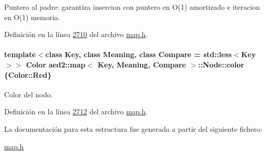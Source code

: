 Puntero al padre\-: garantiza insercion con puntero en O(1) amortizado e iteracion en O(1) memoria. 



Definición en la línea \hyperlink{map_8h_source_l02710}{2710} del archivo \hyperlink{map_8h_source}{map.\-h}.

\hypertarget{structaed2_1_1map_1_1Node_a58dd9993fee8ee3eaa5716b72a3eca47_a58dd9993fee8ee3eaa5716b72a3eca47}{
\paragraph[{color}]{\setlength{\rightskip}{0pt plus 5cm}template$<$class Key, class Meaning, class Compare = std\-::less$<$\-Key$>$$>$ {\bf Color} {\bf aed2\-::map}$<$ Key, Meaning, Compare $>$\-::Node\-::color \{Color\-::\-Red\}}}\label{structaed2_1_1map_1_1Node_a58dd9993fee8ee3eaa5716b72a3eca47_a58dd9993fee8ee3eaa5716b72a3eca47}


Color del nodo. 



Definición en la línea \hyperlink{map_8h_source_l02712}{2712} del archivo \hyperlink{map_8h_source}{map.\-h}.



La documentación para esta estructura fue generada a partir del siguiente fichero\-:\begin{DoxyCompactItemize}
\item 
\hyperlink{map_8h}{map.\-h}\end{DoxyCompactItemize}
